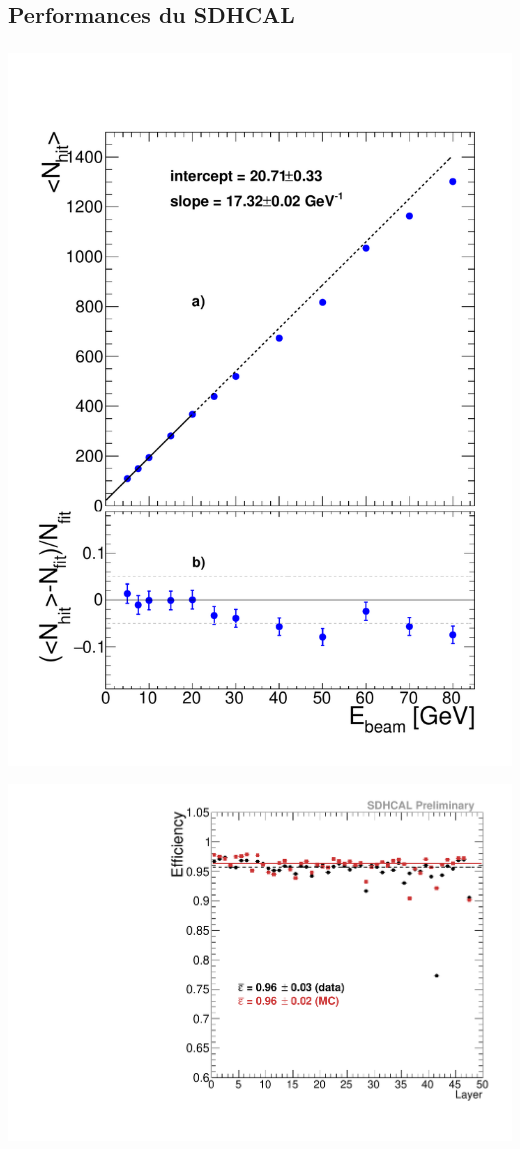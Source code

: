 \documentclass[8pt]{beamer}
\begin{document}
  \subsection{Performances du SDHCAL}

  \begin{frame}
  \frametitle{\secname}
  \framesubtitle{\subsecname}
    \begin{minipage}{0.5\linewidth}
      \includegraphics[width=1\linewidth]{figs/NHITPION.pdf}
    \end{minipage} \hfill
    \begin{minipage}{0.48\linewidth}
      \begin{center}
        \includegraphics[width=0.7\linewidth]{figs/effLayer.pdf} \\

\end{center}
\end{minipage}
\end{frame}
\end{document}
